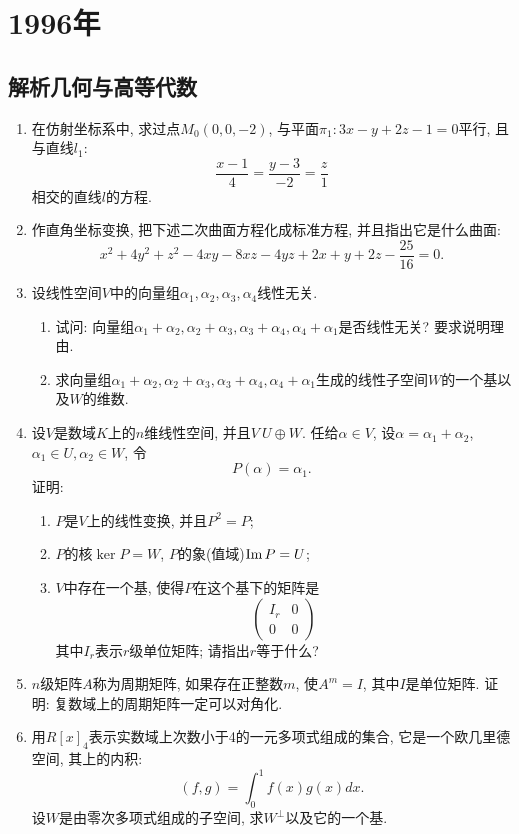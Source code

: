 \documentclass[12pt,a4paper,openany]{book}
\begin{document}
\section{1996年}
\subsection{解析几何与高等代数}
\begin{enumerate}
\item 在仿射坐标系中, 求过点$M_0(0, 0, -2)$, 与平面$\pi_1: 3x - y + 2z - 1 = 0$平行, 且与直线$l_1$:
\[
\frac{x-1}{4} = \frac{y-3}{-2} = \frac{z}{1}
\]
相交的直线$l$的方程.

\item 作直角坐标变换, 把下述二次曲面方程化成标准方程, 并且指出它是什么曲面:
\[
x^2 + 4y^2 + z^2 - 4xy - 8xz - 4yz + 2x + y + 2z - \frac{25}{16} = 0.
\]

\item 设线性空间$V$中的向量组$\alpha_1, \alpha_2, \alpha_3, \alpha_4$线性无关.
\begin{enumerate}
\item 试问: 向量组$\alpha_1 + \alpha_2, \alpha_2 + \alpha_3, \alpha_3 + \alpha_4, \alpha_4 + \alpha_1$是否线性无关? 要求说明理由.
\item 求向量组$\alpha_1 + \alpha_2, \alpha_2 + \alpha_3, \alpha_3 + \alpha_4, \alpha_4 + \alpha_1$生成的线性子空间$W$的一个基以及$W$的维数.
\end{enumerate}

\item 设$V$是数域$K$上的$n$维线性空间, 并且$V \ U \oplus W$. 任给$\alpha \in V$, 设$\alpha = \alpha_1 + \alpha_2$, $\alpha_1 \in U, \alpha_2 \in W$, 令
\[
P(\alpha) = \alpha_1.
\]
证明:
\begin{enumerate}
\item $P$是$V$上的线性变换, 并且$P^2 = P$;

\item $P$的核$\ker{P} = W$, $P$的象(值域)$\text{Im\,}P = U$;

\item $V$中存在一个基, 使得$P$在这个基下的矩阵是
\[
\begin{pmatrix}
I_r & 0 \\
0 & 0
\end{pmatrix}
\]
其中$I_r$表示$r$级单位矩阵; 请指出$r$等于什么?
\end{enumerate}

\item $n$级矩阵$A$称为周期矩阵, 如果存在正整数$m$, 使$A^m = I$, 其中$I$是单位矩阵. 证明: 复数域上的周期矩阵一定可以对角化.

\item 用$R[x]_4$表示实数域上次数小于4的一元多项式组成的集合, 它是一个欧几里德空间, 其上的内积:
\[
(f, g) = \int_{0}^{1}{f(x)g(x)dx}.
\]
设$W$是由零次多项式组成的子空间, 求$W^{\perp}$以及它的一个基.

\end{enumerate}
\end{document}
